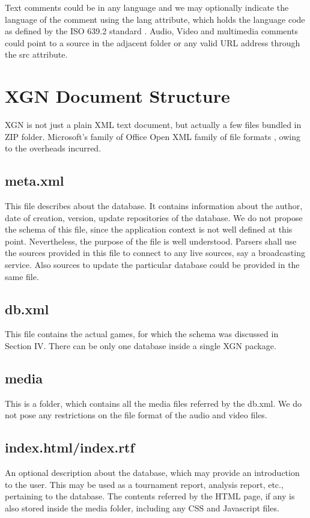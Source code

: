 \documentclass[conference]{IEEEtran}
\begin{document}
Text comments could be in any language and we may optionally indicate the language of the comment using the lang attribute, which holds the language code as defined by the ISO 639.2 standard \cite{ab05}. Audio, Video and multimedia comments could point to a source in the adjacent folder or any valid URL address through the src attribute.


\section{XGN \textendash  Document Structure}
XGN is not just a plain XML text document, but actually a few files bundled in ZIP folder. Microsoft's family of Office Open XML family of file formats \cite{ab06}, owing to the overheads incurred.


\subsection{meta.xml}
This file describes about the database. It contains information about the author, date of creation, version, update repositories of the database. We do not propose the schema of this file, since the application context is not well defined at this point. Nevertheless, the purpose of the file is well understood. Parsers shall use the sources provided in this file to connect to any live sources, say a broadcasting service. Also sources to update the particular database could be provided in the same file.


\subsection{db.xml}
This file contains the actual games, for which the schema was discussed in Section IV. There can be only one database inside a single XGN package.


\subsection{media}
This is a folder, which contains all the media files referred by the db.xml. We do not pose any restrictions on the file format of the audio and video files.


\subsection{index.html/index.rtf}
An optional description about the database, which may provide an introduction to the user. This may be used as a tournament report, analysis report, etc., pertaining to the database. The contents referred by the HTML page, if any is also stored inside the media folder, including any CSS and Javascript files.
\end{document}
